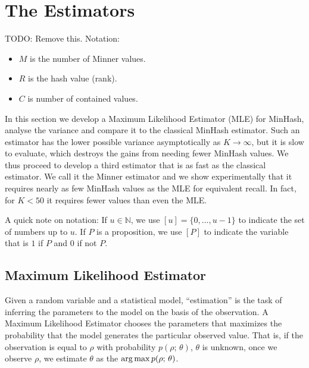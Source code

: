 
\section{The Estimators}

TODO: Remove this.
Notation:
\begin{itemize}
   \item $M$ is the number of Minner values.
   \item $R$ is the hash value (rank).
   \item $C$ is number of contained values.
\end{itemize}

\hspace{1em}

In this section we develop a Maximum Likelihood Estimator (MLE) for MinHash, analyse the variance and compare it to the classical MinHash estimator.
Such an estimator has the lower possible variance asymptotically as $K\to\infty$, but it is slow to evaluate, which destroys the gains from needing fewer MinHash values.
We thus proceed to develop a third estimator that is as fast as the classical estimator.
We call it the Minner estimator and we show experimentally that it requires nearly as few MinHash values as the MLE for equivalent recall.
In fact, for $K < 50$ it requires fewer values than even the MLE.

A quick note on notation: If $u\in\mathbb N$, we use $[u]=\{0,\dots,u-1\}$ to indicate the set of numbers up to $u$.
If $P$ is a proposition, we use $[P]$ to indicate the variable that is $1$ if $P$ and $0$ if not $P$.

\subsection{Maximum Likelihood Estimator}

Given a random variable and a statistical model, ``estimation'' is the task of inferring the parameters to the model on the basis of the observation.
A Maximum Likelihood Estimator chooses the parameters that maximizes the probability that the model generates the particular observed value.
That is, if the observation is equal to $\rho$ with probability $p(\rho;\,\theta)$, $\theta$ is unknown, once we observe $\rho$, we estimate $\theta$ as the $\operatorname*{arg\,max} p(\rho;\,\theta)$.


